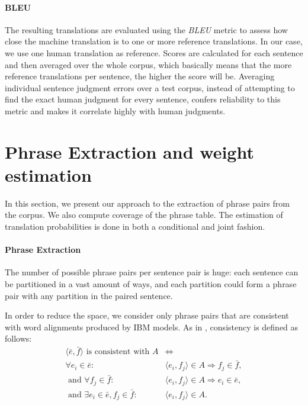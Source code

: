 \documentclass[11pt]{article}
\begin{document}
\paragraph{BLEU} The resulting translations are evaluated using the \textit{BLEU} metric to assess how close the machine translation is to one or more reference translations. In our case, we use one human translation as reference. Scores are calculated for each sentence and then averaged over the whole corpus, which basically means that the more reference translations per sentence, the higher the score will be. Averaging individual sentence judgment errors over a test corpus, instead of attempting to find the exact human judgment for every sentence, confers reliability to this metric and makes it correlate highly with human judgments.


\section{Phrase Extraction and weight estimation}
\label{phraseExtraction}

In this section, we present our approach to the extraction of phrase pairs from the corpus. We also compute coverage of the phrase table. The estimation of translation probabilities is done in both a conditional and joint fashion.

\paragraph{Phrase Extraction}
The number of possible phrase pairs per sentence pair is huge: each sentence can be partitioned in a vast amount of ways, and each partition could form a phrase pair with any partition in the paired sentence. 

In order to reduce the space, we consider only phrase pairs that are consistent with word alignments produced by IBM models.
As in \cite{Koehn:2010}, consistency is defined as follows:
\begin{align*}
\langle \bar{e},\bar{f}\rangle\text{ is consistent with }A &\Leftrightarrow\\
\forall e_i\in \bar{e}: &\langle e_i,f_j\rangle \in A \Rightarrow f_j \in \bar{f}, \\
\text{ and }\forall f_j\in \bar{f}: &\langle e_i,f_j\rangle \in A \Rightarrow e_i \in \bar{e}, \\
\text{ and }\exists e_i \in \bar{e}, f_j\in \bar{f}: &\langle e_i,f_j\rangle \in A.\\
\end{align*}
\end{document}
